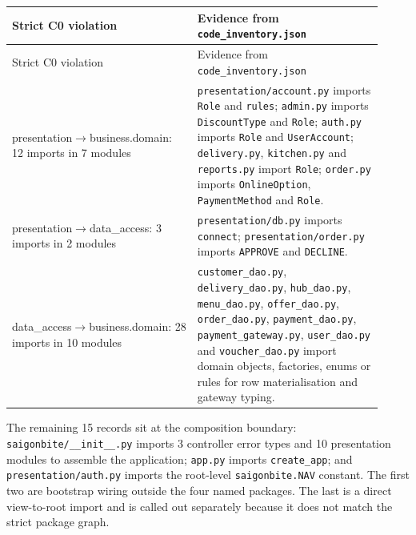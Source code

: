 \begin{longtable}{>{\raggedright\arraybackslash}p{0.4600\linewidth}>{\raggedright\arraybackslash}p{0.4600\linewidth}}
Strict C0 violation & Evidence from \texttt{code\_\allowbreak{}inventory.\allowbreak{}json} \\
\hline\endfirsthead
Strict C0 violation & Evidence from \texttt{code\_\allowbreak{}inventory.\allowbreak{}json} \\
\hline\endhead
presentation\ensuremath{\rightarrow}business.domain: 12 imports in 7 modules & \texttt{presentation/\allowbreak{}account.\allowbreak{}py} imports \texttt{Role} and \texttt{rules}; \texttt{admin.\allowbreak{}py} imports \texttt{DiscountType} and \texttt{Role}; \texttt{auth.\allowbreak{}py} imports \texttt{Role} and \texttt{UserAccount}; \texttt{delivery.\allowbreak{}py}, \texttt{kitchen.\allowbreak{}py} and \texttt{reports.\allowbreak{}py} import \texttt{Role}; \texttt{order.\allowbreak{}py} imports \texttt{OnlineOption}, \texttt{PaymentMethod} and \texttt{Role}. \\
presentation\ensuremath{\rightarrow}data\_access: 3 imports in 2 modules & \texttt{presentation/\allowbreak{}db.\allowbreak{}py} imports \texttt{connect}; \texttt{presentation/\allowbreak{}order.\allowbreak{}py} imports \texttt{APPROVE} and \texttt{DECLINE}. \\
data\_access\ensuremath{\rightarrow}business.domain: 28 imports in 10 modules & \texttt{customer\_\allowbreak{}dao.\allowbreak{}py}, \texttt{delivery\_\allowbreak{}dao.\allowbreak{}py}, \texttt{hub\_\allowbreak{}dao.\allowbreak{}py}, \texttt{menu\_\allowbreak{}dao.\allowbreak{}py}, \texttt{offer\_\allowbreak{}dao.\allowbreak{}py}, \texttt{order\_\allowbreak{}dao.\allowbreak{}py}, \texttt{payment\_\allowbreak{}dao.\allowbreak{}py}, \texttt{payment\_\allowbreak{}gateway.\allowbreak{}py}, \texttt{user\_\allowbreak{}dao.\allowbreak{}py} and \texttt{voucher\_\allowbreak{}dao.\allowbreak{}py} import domain objects, factories, enums or rules for row materialisation and gateway typing. \\
\end{longtable}
The remaining 15 records sit at the composition boundary: \texttt{saigonbite/\allowbreak{}\_\allowbreak{}\_\allowbreak{}init\_\allowbreak{}\_\allowbreak{}.\allowbreak{}py} imports 3 controller error types and 10 presentation modules to assemble the application; \texttt{app.\allowbreak{}py} imports \texttt{create\_\allowbreak{}app}; and \texttt{presentation/\allowbreak{}auth.\allowbreak{}py} imports the root-level \texttt{saigonbite.\allowbreak{}NAV} constant. The first two are bootstrap wiring outside the four named packages. The last is a direct view-to-root import and is called out separately because it does not match the strict package graph.

